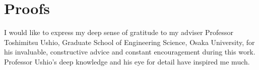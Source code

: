 \documentclass[a4j,12pt,oneside,openany,english,dvipdfmx]{jsbook}
\begin{document}
\chapter{Proofs}






\begin{acknowledgement}
	I would like to express my deep sense of gratitude to my adviser Professor
	Toshimitsu Ushio, Graduate School of Engineering Science, Osaka University,
	for his invaluable, constructive advice and constant encouragement during this work.
	Professor Ushio's deep knowledge and his eye for detail have inspired me much.
\end{acknowledgement}
\end{document}
